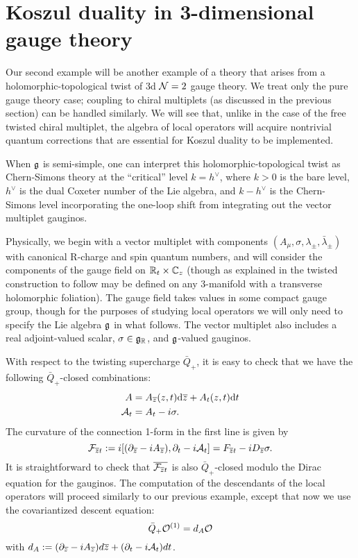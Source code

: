 \documentclass[11pt]{amsart}
\def\brian#1{{\textcolor{blue!65!red}{BRW: {#1}}}}
\begin{document}
\section{Koszul duality in 3-dimensional gauge theory}\label{s:crit}


Our second example will be another example of a theory that arises from a holomorphic-topological twist of 3d $\mathcal N=2$ gauge theory. 
We treat only the pure gauge theory case; coupling to chiral multiplets (as discussed in the previous section) can be handled similarly. 
We will see that, unlike in the case of the free twisted chiral multiplet, the algebra of local operators will acquire nontrivial quantum corrections that are essential for Koszul duality to be implemented. 

When $\mathfrak g$ is semi-simple, one can interpret this holomorphic-topological twist as Chern-Simons theory at the ``critical'' level $k = h^{\vee}$, where $k > 0$ is the bare level, $h^{\vee}$ is the dual Coxeter number of the Lie algebra, and $k - h^{\vee}$ is the Chern-Simons level incorporating the one-loop shift from integrating out the vector multiplet gauginos. 

Physically, we begin with a vector multiplet with components $(A_{\mu}, \sigma, \lambda_{\pm}, \bar{\lambda}_{\pm})$ with canonical R-charge and spin quantum numbers, and will consider the components of the gauge field on $\mathbb R_t \times \mathbb C_{z}$ (though as explained in \cite{ACNV} the twisted construction to follow may be defined on any 3-manifold with a transverse holomorphic foliation). The gauge field takes values in some compact gauge group, though for the purposes of studying local operators we will only need to specify the Lie algebra $\mathfrak g$ in what follows. The vector multiplet also includes a real adjoint-valued scalar, $\sigma \in \mathfrak g_{\mathbb R}$, and $\mathfrak g$-valued gauginos. 


With respect to the twisting supercharge $\bar{Q}_+$, it is easy to check that we have the following $\bar{Q}_+$-closed combinations:
\begin{align}
A & = A_{{\overline{z}}} (z,t) {\rm d} {\overline{z}} + A_{t} (z, t) {\rm d} t \\
\mathcal A_t &= A_t - i \sigma.
\end{align}
The curvature of the connection 1-form in the first line is given by
\[
\mathcal F_{{\overline{z}} t} := i  [(\partial_{{\overline{z}}} - i A_{{\overline{z}}}), \partial_t - i \mathcal A_t] = F_{{\overline{z}} t} - i D_{{\overline{z}}}\sigma.
\] It is straightforward to check that $\overline{\mathcal F_{{\overline{z}} t}}$ is also $\bar{Q}_+$-closed modulo the Dirac equation for the gauginos. 
The computation of the descendants of the local operators will proceed similarly to our previous example, except that now we use the covariantized descent equation:
\[
\bar{Q}_+ \mathcal O^{(1)} = d_{A} \mathcal O
\] with $d_A := (\partial_{{\overline{z}}} - i A_{{\overline{z}}})d{\overline{z}} + (\partial_t - i \mathcal A_t)dt$. 
\end{document}
